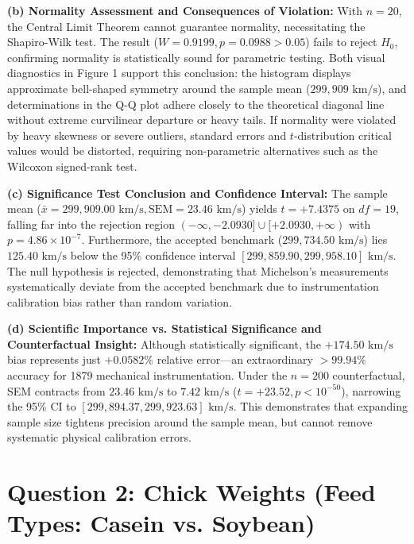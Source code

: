 \documentclass[11pt,a4paper]{article}
\begin{document}
\textbf{(b) Normality Assessment and Consequences of Violation:} With $n = 20$, the Central Limit Theorem cannot guarantee normality, necessitating the Shapiro-Wilk test. The result ($W = 0.9199, p = 0.0988 > 0.05$) fails to reject $H_0$, confirming normality is statistically sound for parametric testing. Both visual diagnostics in Figure 1 support this conclusion: the histogram displays approximate bell-shaped symmetry around the sample mean ($299,909\text{ km/s}$), and determinations in the Q-Q plot adhere closely to the theoretical diagonal line without extreme curvilinear departure or heavy tails. If normality were violated by heavy skewness or severe outliers, standard errors and $t$-distribution critical values would be distorted, requiring non-parametric alternatives such as the Wilcoxon signed-rank test.

\textbf{(c) Significance Test Conclusion and Confidence Interval:} The sample mean ($\bar{x} = 299,909.00\text{ km/s}, \text{SEM} = 23.46\text{ km/s}$) yields $t = +7.4375$ on $df = 19$, falling far into the rejection region $(-\infty, -2.0930] \cup [+2.0930, +\infty)$ with $p = 4.86\times 10^{-7}$. Furthermore, the accepted benchmark ($299,734.50\text{ km/s}$) lies $125.40\text{ km/s}$ below the 95\% confidence interval $[299,859.90, 299,958.10]\text{ km/s}$. The null hypothesis is rejected, demonstrating that Michelson's measurements systematically deviate from the accepted benchmark due to instrumentation calibration bias rather than random variation.

\textbf{(d) Scientific Importance vs. Statistical Significance and Counterfactual Insight:} Although statistically significant, the $+174.50\text{ km/s}$ bias represents just $+0.0582\%$ relative error---an extraordinary $>99.94\%$ accuracy for 1879 mechanical instrumentation. Under the $n = 200$ counterfactual, SEM contracts from $23.46\text{ km/s}$ to $7.42\text{ km/s}$ ($t = +23.52, p < 10^{-50}$), narrowing the 95\% CI to $[299,894.37, 299,923.63]\text{ km/s}$. This demonstrates that expanding sample size tightens precision around the sample mean, but cannot remove systematic physical calibration errors.

\newpage
\section*{Question 2: Chick Weights (Feed Types: Casein vs. Soybean)}
\end{document}
